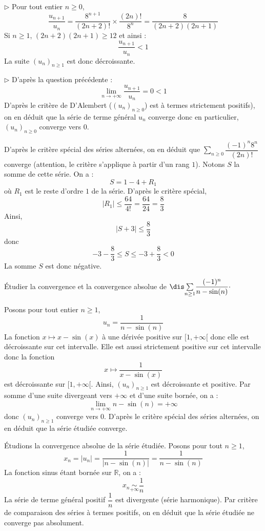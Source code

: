 \documentclass[a4paper,10pt]{report}
\newcommand{\Sum}[2]{\ensuremath{\textstyle{\sum\limits_{#1}^{#2}}}}
\begin{document}
\medskip

\noindent $\rhd$ Pour tout entier $n \geq 0$,
$$ \dfrac{u_{n+1}}{u_n} = \dfrac{8^{n+1}}{(2n+2)!} \times \dfrac{(2n)!}{8^n} =\dfrac{8}{(2n+2)(2n+1)}$$
Si $n \geq 1$, $(2n+2)(2n+1) \geq 12$ et ainsi :
$$  \dfrac{u_{n+1}}{u_n} < 1$$
La suite $(u_n)_{n \geq 1}$ est donc décroissante.

\medskip

\noindent $\rhd$ D'après la question précédente :
$$ \lim_{n \rightarrow + \infty}  \dfrac{u_{n+1}}{u_n} = 0 <1$$
D'après le critère de D'Alembert ($(u_n)_{n \geq 0}$) est à termes strictement positifs), on en déduit que la série de terme général $u_n$ converge donc en particulier, $(u_n)_{n \geq 0}$ converge vers $0$.

\medskip

\noindent D'après le critère spécial des séries alternées, on en déduit que $\Sum{n \geq 0}{} {\dfrac{( - 1)^n 8^n}{(2n)!}}$ converge (attention, le critère s'applique à partir d'un rang $1$). Notons $S$ la somme de cette série. On a :
$$ S= 1 - 4 + R_1$$
où $R_1$ est le reste d'ordre $1$ de la série. D'après le critère spécial, 
$$ \vert R_1 \vert \leq \dfrac{64}{4!} = \dfrac{64}{24} = \dfrac{8}{3}$$
Ainsi, 
$$ \vert S + 3 \vert \leq \dfrac{8}{3}$$
donc 
$$ -3- \dfrac{8}{3} \leq S \leq -3 + \dfrac{8}{3} <0$$
La somme $S$ est donc négative.


\begin{Exa} Étudier la convergence et la convergence absolue de $\dis \Sum{n \geq 1}{} \dfrac{(-1)^n}{n-\sin(n)}\cdot$
\end{Exa}

\corr Posons pour tout entier $n \geq 1$,
$$ u_n = \dfrac{1}{n-\sin(n)}$$
La fonction $x \mapsto x- \sin(x)$ à une dérivée positive sur $[1, + \infty[$ donc elle est décroissante sur cet intervalle. Elle est aussi strictement positive sur cet intervalle donc la fonction 
$$ x \mapsto \dfrac{1}{x-\sin(x)}$$
est décroissante sur $[1, + \infty[$. Ainsi, $(u_n)_{n \geq 1}$ est décroissante et positive. Par somme d'une suite divergeant vers $+ \infty$ et d'une suite bornée, on a :
$$ \lim_{n \rightarrow + \infty} n - \sin(n) = + \infty$$
donc $(u_n)_{n \geq 1}$ converge vers $0$. D'après le critère spécial des séries alternées, on en déduit que la série étudiée converge.

\medskip

\noindent Étudions la convergence absolue de la série étudiée. Posons pour tout $n \geq 1$,
$$ x_n = \vert u_n \vert = \dfrac{1}{\vert n - \sin(n) \vert} = \dfrac{1}{n- \sin(n)}$$
La fonction sinus étant bornée sur $\mathbb{R}$, on a :
$$ x_n \underset{+ \infty}{\sim} \dfrac{1}{n}$$
La série de terme général positif $\dfrac{1}{n}$ est divergente (série harmonique). Par critère de comparaison des séries à termes positifs, on en déduit que la série étudiée ne converge pas absolument.
\end{document}
